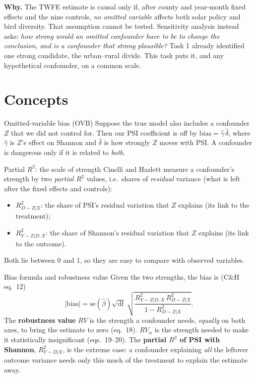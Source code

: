 \documentclass[11pt]{article}
\begin{document}
\textbf{Why.} The TWFE estimate is causal only if, after county and year-month fixed effects and the nine controls, \emph{no omitted variable} affects both solar policy and bird diversity. That assumption cannot be tested. Sensitivity analysis instead asks: \emph{how strong would an omitted confounder have to be to change the conclusion, and is a confounder that strong plausible?} Task 1 already identified one strong candidate, the urban--rural divide. This task puts it, and any hypothetical confounder, on a common scale.

\section{Concepts}

\begin{conceptbox}{Omitted-variable bias (OVB)}
Suppose the true model also includes a confounder $Z$ that we did not control for. Then our PSI coefficient is off by $\text{bias}=\hat\gamma\,\hat\delta$, where $\hat\gamma$ is $Z$'s effect on Shannon and $\hat\delta$ is how strongly $Z$ moves with PSI. A confounder is dangerous only if it is related to \emph{both}.
\end{conceptbox}

\begin{conceptbox}{Partial $R^2$: the scale of strength}
Cinelli and Hazlett measure a confounder's strength by two \emph{partial $R^2$} values, i.e.\ shares of \emph{residual} variance (what is left after the fixed effects and controls):
\begin{itemize}[leftmargin=12pt]
\item $R^2_{D\sim Z|X}$: the share of PSI's residual variation that $Z$ explains (its link to the treatment);
\item $R^2_{Y\sim Z|D,X}$: the share of Shannon's residual variation that $Z$ explains (its link to the outcome).
\end{itemize}
Both lie between 0 and 1, so they are easy to compare with observed variables.
\end{conceptbox}

\begin{conceptbox}{Bias formula and robustness value}
Given the two strengths, the bias is (C\&H eq.~12)
\[
|\text{bias}| = \text{se}(\hat\beta)\sqrt{\text{df}}\;\sqrt{\frac{R^2_{Y\sim Z|D,X}\,R^2_{D\sim Z|X}}{1-R^2_{D\sim Z|X}}}.
\]
The \textbf{robustness value} $RV$ is the strength a confounder needs, \emph{equally} on both axes, to bring the estimate to zero (eq.~18). $RV_\alpha$ is the strength needed to make it statistically insignificant (eqs.~19--20). The \textbf{partial $R^2$ of PSI with Shannon}, $R^2_{Y\sim D|X}$, is the extreme case: a confounder explaining \emph{all} the leftover outcome variance needs only this much of the treatment to explain the estimate away.
\end{conceptbox}
\end{document}
